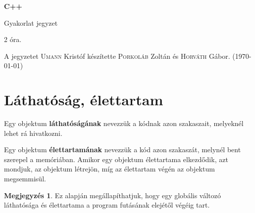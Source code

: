 \documentclass[a4paper,11.5pt]{article}
\begin{document}
	\setlength\parindent{0pt}
	\def\s{\hspace{0.2mm}\vphantom{\beta}}
	\def\Z{\mathbb{Z}}
	\def\Q{\mathbb{Q}}
	\def\R{\mathbb{R}}
	\def\C{\mathbb{C}}
	\def\N{\mathbb{N}}
	\def\Ra{\overline{\mathbb{R}}}
	
	\def\sume{\displaystyle\sum_{n=1}^{+\infty}}
	\def\sumn{\displaystyle\sum_{n=0}^{+\infty}}
	
	\def\narrow{\underset{n\rightarrow+\infty}{\longrightarrow}}
	\def\limn{\displaystyle\lim_{n\to +\infty}}
	\def\limx{\displaystyle\lim_{x\to +\infty}}
	
	\theoremstyle{definition}
	\newtheorem{theorem}{Tétel}[subsection] 
	
	\theoremstyle{definition}
	\newtheorem{definition}[theorem]{Definíció} 
	\newtheorem{example}[theorem]{Példa} 
	\newtheorem{task}[theorem]{Feladat} 
	\newtheorem{note}[theorem]{Megjegyzés}
	\begin{center}
		{\LARGE\textbf{C++}}
		
		{\Large Gyakorlat jegyzet}
		
		2 óra.
	\end{center}
	A jegyzetet \textsc{Umann} Kristóf készítette \textsc{Porkoláb} Zoltán és \textsc{Horváth} Gábor. (\today)
	
	
	
	\section{Láthatóság, élettartam}
	Egy objektum \textbf{láthatóságának} nevezzük a kódnak azon szakaszait, melyeknél lehet rá hivatkozni.
	\smallskip
	
	Egy objektum \textbf{élettartamának} nevezzük a kód azon szakaszát, melynél bent szerepel a memóriában. Amikor egy objektum élettartama elkezdődik, azt mondjuk, az objektum létrejön, míg az élettartam végén az objektum megsemmisül.
	\medskip
	\begin{note}
		Ez alapján megállapíthatjuk, hogy egy globális változó láthatósága és élettartama a program futásának elejétől végéig tart.
	\end{note}
	
\end{document}
